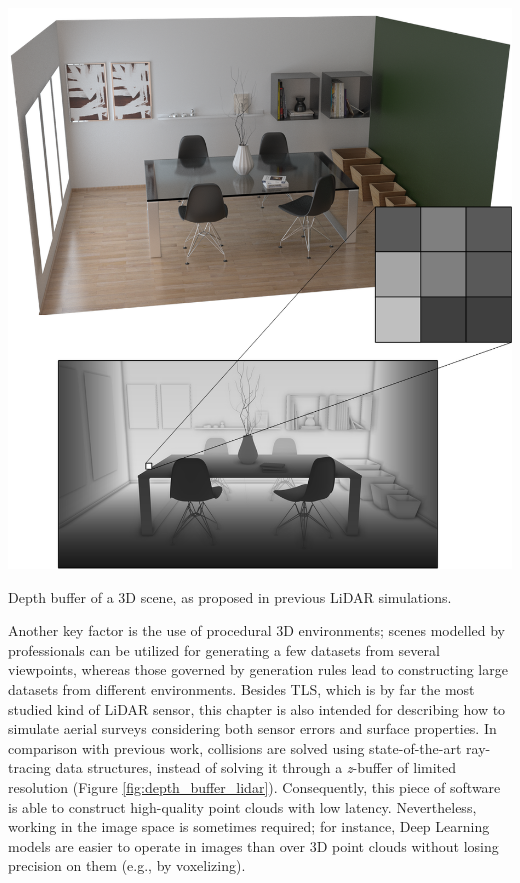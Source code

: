 \begin{marginfigure}[3cm]
    \centering
    \includegraphics[width=\linewidth]{figs/lidar_simulation/depth_buffer.png}
	\caption{Depth buffer of a 3D scene, as proposed in previous LiDAR simulations. }
	\label{fig:depth_buffer_lidar}
\end{marginfigure}
Another key factor is the use of procedural 3D environments; scenes modelled by professionals can be utilized for generating a few datasets from several viewpoints, whereas those governed by generation rules lead to constructing large datasets from different environments. Besides TLS, which is by far the most studied kind of LiDAR sensor, this chapter is also intended for describing how to simulate aerial surveys considering both sensor errors and surface properties. In comparison with previous work, collisions are solved using state-of-the-art ray-tracing data structures, instead of solving it through a \textit{z}-buffer of limited resolution (Figure \ref{fig:depth_buffer_lidar}). Consequently, this piece of software is able to construct high-quality point clouds with low latency. Nevertheless, working in the image space is sometimes required; for instance, Deep Learning models are easier to operate in images than over 3D point clouds without losing precision on them (e.g., by voxelizing).

